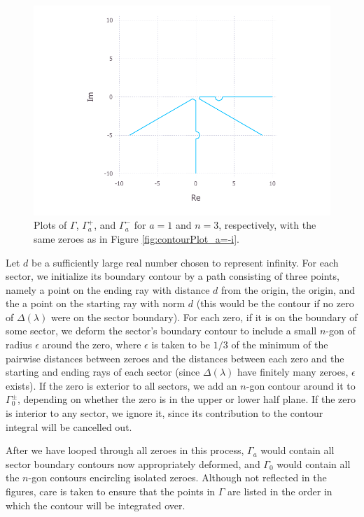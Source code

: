 \documentclass[11pt, oneside, a4paper]{article}
\begin{document}
\begin{figure}[htpb!]
      \includegraphics[width=\linewidth]{contourPlot_a=1_n=3_lower.pdf}
    \endminipage
    \caption{Plots of $\Gamma$, $\Gamma_a^+$, and $\Gamma_a^-$ for $a=1$ and $n=3$, respectively, with the same zeroes as in Figure \ref{fig:contourPlot_a=-i}.}
    \label{fig:contourPlot_a=1}
\end{figure}

Let $d$ be a sufficiently large real number chosen to represent infinity. For each sector, we initialize its boundary contour by a path consisting of three points, namely a point on the ending ray with distance $d$ from the origin, the origin, and the a point on the starting ray with norm $d$ (this would be the contour if no zero of $\Delta(\lambda)$ were on the sector boundary). For each zero, if it is on the boundary of some sector, we deform the sector's boundary contour to include a small $n$-gon of radius $\epsilon$ around the zero, where $\epsilon$ is taken to be $1/3$ of the minimum of the pairwise distances between zeroes and the distances between each zero and the starting and ending rays of each sector (since $\Delta(\lambda)$ have finitely many zeroes, $\epsilon$ exists). If the zero is exterior to all sectors, we add an $n$-gon contour around it to $\Gamma_0^{\pm}$, depending on whether the zero is in the upper or lower half plane. If the zero is interior to any sector, we ignore it, since its contribution to the contour integral will be cancelled out. 

After we have looped through all zeroes in this process, $\Gamma_a$ would contain all sector boundary contours now appropriately deformed, and $\Gamma_0$ would contain all the $n$-gon contours encircling isolated zeroes. Although not reflected in the figures, care is taken to ensure that the points in $\Gamma$ are listed in the order in which the contour will be integrated over. 
\end{document}
